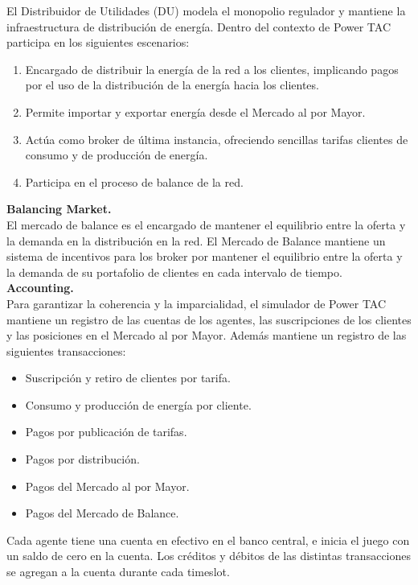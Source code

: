 El Distribuidor de Utilidades (DU) modela el monopolio regulador y mantiene la infraestructura de distribución de energía. Dentro del contexto de Power TAC participa en los siguientes escenarios:

\begin{enumerate}
	\item Encargado de distribuir la energía de la red a los clientes, implicando pagos por el uso de la distribución de la energía hacia los clientes.
	\item Permite importar y exportar energía desde el Mercado al por Mayor.
	\item Actúa como broker de última instancia, ofreciendo sencillas tarifas clientes de consumo y de producción de energía.
	\item Participa en el proceso de balance de la red.
\end{enumerate}

\textbf{Balancing Market.}\\

El mercado de balance es el encargado de mantener el equilibrio entre la oferta y la demanda en la distribución en la red. 
El Mercado de Balance mantiene un sistema de incentivos para los broker por mantener el equilibrio entre la oferta y la demanda de su portafolio de clientes en cada intervalo de tiempo.\\

\textbf{Accounting.}\\

Para garantizar la coherencia y la imparcialidad, el simulador de Power TAC mantiene un registro de las cuentas de los agentes, las suscripciones de los clientes y las posiciones en el Mercado al por Mayor. Además mantiene un registro de las siguientes transacciones:

\begin{itemize}
	\item Suscripción y retiro de clientes por tarifa.
	\item Consumo y producción de energía por cliente.
	\item Pagos por publicación de tarifas.
	\item Pagos por distribución.
	\item Pagos del Mercado al por Mayor.
	\item Pagos del Mercado de Balance.    
\end{itemize}

Cada agente tiene una cuenta en efectivo en el banco central, e inicia el juego con un saldo de cero en la cuenta. Los créditos y débitos de las distintas transacciones se agregan a la cuenta durante cada timeslot.\\

